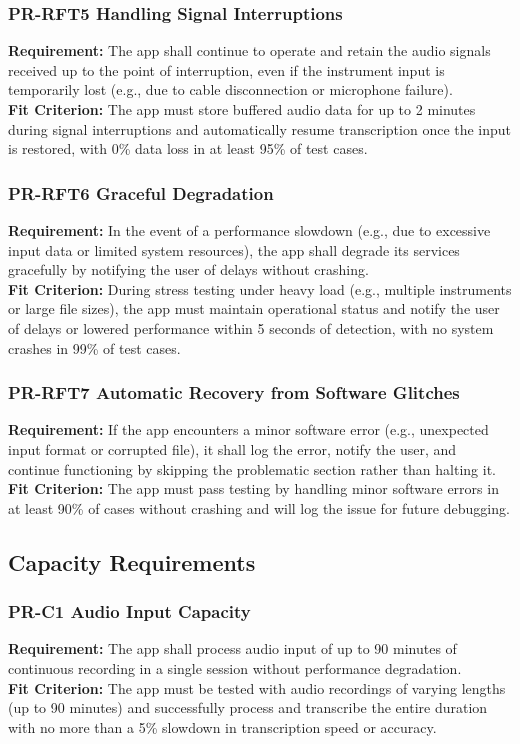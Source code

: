 \documentclass[12pt]{article}
\begin{document}
\subsubsection*{PR-RFT5 Handling Signal Interruptions}
\textbf{Requirement:} The app shall continue to operate and retain the audio signals received up to the point of interruption, even if the instrument input is temporarily lost (e.g., due to cable disconnection or microphone failure).\\
\textbf{Fit Criterion:} The app must store buffered audio data for up to 2 minutes during signal interruptions and automatically resume transcription once the input is restored, with 0\% data loss in at least 95\% of test cases.
\subsubsection*{PR-RFT6 Graceful Degradation}
\textbf{Requirement:} In the event of a performance slowdown (e.g., due to excessive input data or limited system resources), the app shall degrade its services gracefully by notifying the user of delays without crashing.\\
\textbf{Fit Criterion:} During stress testing under heavy load (e.g., multiple instruments or large file sizes), the app must maintain operational status and notify the user of delays or lowered performance within 5 seconds of detection, with no system crashes in 99\% of test cases.
\subsubsection*{PR-RFT7 Automatic Recovery from Software Glitches}
\textbf{Requirement:} If the app encounters a minor software error (e.g., unexpected input format or corrupted file), it shall log the error, notify the user, and continue functioning by skipping the problematic section rather than halting it.\\
\textbf{Fit Criterion:} The app must pass testing by handling minor software errors in at least 90\% of cases without crashing and will log the issue for future debugging.

\subsection{Capacity Requirements}
\subsubsection*{PR-C1 Audio Input Capacity}
\textbf{Requirement:} The app shall process audio input of up to 90 minutes of continuous recording in a single session without performance degradation.\\
\textbf{Fit Criterion:} The app must be tested with audio recordings of varying lengths (up to 90 minutes) and successfully process and transcribe the entire duration with no more than a 5\% slowdown in transcription speed or accuracy.
\end{document}
